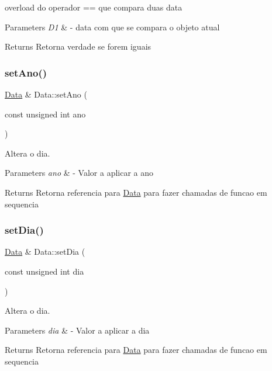 overload do operador == que compara duas data 


\begin{DoxyParams}{Parameters}
{\em D1} & -\/ data com que se compara o objeto atual \\
\hline
\end{DoxyParams}
\begin{DoxyReturn}{Returns}
Retorna verdade se forem iguais 
\end{DoxyReturn}
\mbox{\label{class_data_a8d4cfad647b590df436d8260000a2745}} 
\subsubsection{\texorpdfstring{set\+Ano()}{setAno()}}
{\footnotesize\ttfamily \mbox{\hyperlink{class_data}{Data}} \& Data\+::set\+Ano (\begin{DoxyParamCaption}\item[{const unsigned int}]{ano }\end{DoxyParamCaption})}



Altera o dia. 


\begin{DoxyParams}{Parameters}
{\em ano} & -\/ Valor a aplicar a ano \\
\hline
\end{DoxyParams}
\begin{DoxyReturn}{Returns}
Retorna referencia para \mbox{\hyperlink{class_data}{Data}} para fazer chamadas de funcao em sequencia 
\end{DoxyReturn}
\mbox{\label{class_data_a3e2c5356bc8d548b75c7d085f7a7c4ee}} 
\subsubsection{\texorpdfstring{set\+Dia()}{setDia()}}
{\footnotesize\ttfamily \mbox{\hyperlink{class_data}{Data}} \& Data\+::set\+Dia (\begin{DoxyParamCaption}\item[{const unsigned int}]{dia }\end{DoxyParamCaption})}



Altera o dia. 


\begin{DoxyParams}{Parameters}
{\em dia} & -\/ Valor a aplicar a dia \\
\hline
\end{DoxyParams}
\begin{DoxyReturn}{Returns}
Retorna referencia para \mbox{\hyperlink{class_data}{Data}} para fazer chamadas de funcao em sequencia 
\end{DoxyReturn}
\mbox{\label{class_data_ab15051ae481d89d057b22abc8152584c}} 
